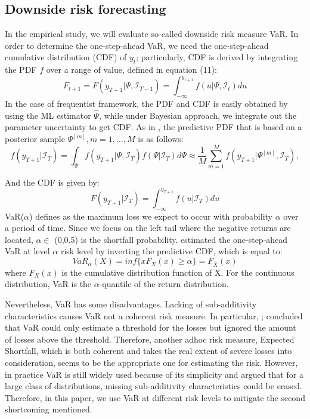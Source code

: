 \documentclass[12pt,a4paper]{article}
\begin{document}
\subsection{Downside risk forecasting}
In the empirical study, we will evaluate so-called downside risk measure VaR. In order to determine the one-step-ahead VaR, we need the one-step-ahead cumulative distribution (CDF) of $y_t$; particularly,  CDF is derived by integrating the PDF $f$ over a range of value, defined in equation (11):
\begin{equation}
	F_{t+1} = F(y_{T+1} \vert \Psi, \mathcal{I}_{T-1}) = \int^{y_{t+1}}_{-\infty} f(u \vert \Psi, \mathcal{I}_t)du
\end{equation}
In the case of frequentist framework, the PDF and CDF is easily obtained by using the ML estimator $\hat{\Psi}$, while under Bayesian approach, we integrate out the parameter uncertainty to get CDF. As in \cite{ardia2018forecasting}, the predictive PDF that is based on a posterior sample ${\Psi^{[m]}, m = 1, \ldots, M}$ is as follows:
\begin{equation}
	f(y_{T+1} \vert \mathcal{I}_T) =  \int_\Psi f(y_{T+1} \vert \Psi, \mathcal{I}_T) f(\Psi \vert \mathcal{I}_T) d\Psi \approx \frac{1}{M} \sum^M_{m=1} f(y_{T+1} \vert \Psi^{[m]}, \mathcal{I}_T),
\end{equation}

And the CDF is given by:
\begin{equation} 
	F(y_{T+1} \vert \mathcal{I}_T) = \int^{y_{T+1}}_{-\infty} f(u \vert \mathcal{I}_T)du
\end{equation}
VaR($\alpha$) defines as the maximum loss we expect to occur with probability $\alpha$ over a period of time. Since we focus on the left tail where the negative returns are located, $\alpha \in$ (0,0.5) is the shortfall probability. \cite{caporale2019modelling} estimated the one-step-ahead VaR at level $\alpha$ risk level by inverting the predictive CDF, which is equal to:
\begin{equation}
	VaR_\alpha(X) = inf \{xF_X(x) \geq \alpha\} = F_{\bar{X}}(x)
\end{equation}
where $F_X(x)$ is the cumulative distribution function of X. For the continuous distribution, VaR is the $\alpha$-quantile of the return distribution. \par 
Nevertheless, VaR has some disadvantages. Lacking of sub-additivity characteristics causes VaR not a coherent risk measure. In particular, \cite{acerbi2002expected}; \cite{christoffersen2004backtesting} concluded that VaR could only estimate a threshold for the losses but ignored the amount of losses above the threshold. Therefore, another adhoc risk measure, Expected Shortfall, which is both coherent and takes the real extent of severe losses into consideration, seems to be the appropriate one for estimating the risk. However, in practice VaR is still widely used because of its simplicity and \cite{nieto2016frontiers} argued that for a large class of distributions, missing sub-additivity characteristics could be erased. Therefore, in this paper, we use VaR at different risk levels to mitigate the second shortcoming mentioned. \par
\end{document}
